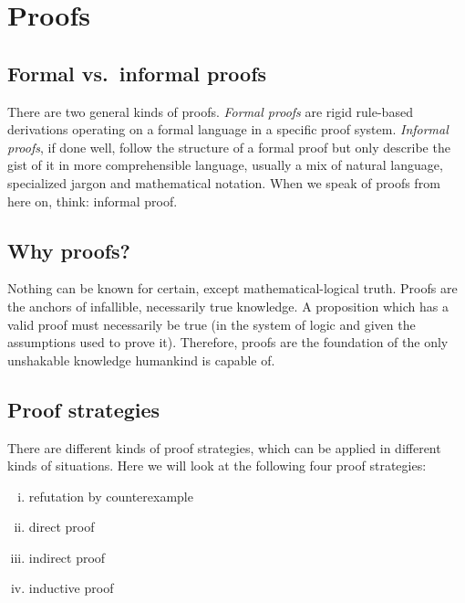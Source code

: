 \documentclass[nobib,nofonts]{tufte-handout}
\begin{document}
\newpage

\section{Proofs}

\subsection{Formal vs.~informal proofs}

There are two general kinds of proofs.
\emph{Formal proofs} are rigid rule-based derivations operating on a formal language in a specific proof system.
\emph{Informal proofs}, if done well, follow the structure of a formal proof but only describe the gist of it in more comprehensible language, usually a mix of natural language, specialized jargon and mathematical notation.
When we speak of proofs from here on, think: informal proof.

\subsection{Why proofs?}

Nothing can be known for certain, except mathematical-logical truth.
Proofs are the anchors of infallible, necessarily true knowledge.
A proposition which has a valid proof must necessarily be true (in the system of logic and given the assumptions used to prove it).
Therefore, proofs are the foundation of the only unshakable knowledge humankind is capable of.

\subsection{Proof strategies}

There are different kinds of proof strategies, which can be applied in different kinds of situations.
Here we will look at the following four proof strategies:

\begin{enumerate}[(i)]
  \item refutation by counterexample
  \item direct proof
  \item indirect proof
  \item inductive proof
\end{enumerate}
\end{document}
